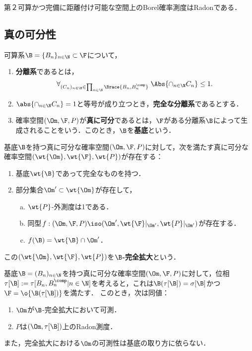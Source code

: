 \documentclass[uplatex,dvipdfmx]{jsreport}
\begin{document}
\begin{proposition}
    第２可算かつ完備に距離付け可能な空間上のBorel確率測度はRadonである．
\end{proposition}

\subsection{真の可分性}

\begin{definition}
    可算系$\B=\{B_n\}_{n\in\N}\subset\F$について，
    \begin{enumerate}
        \item \textbf{分離系}であるとは，
        \[\forall_{(C_n)_{n\in\N}\in\prod_{n\in\N}\Brace{B_n,B_n^\comp}}\;\Abs{\cap_{n\in\N}C_n}\le1.\]
        \item $\abs{\cap_{n\in\N}C_n}=1$と等号が成り立つとき，\textbf{完全な分離系}であるとする．
        \item 確率空間$(\Om,\F,P)$が\textbf{真に可分}であるとは，$\F$がある分離系$\B$によって生成されることをいう．このとき，$\B$を\textbf{基底}という．
    \end{enumerate}
\end{definition}

\begin{lemma}[真に可分な確率空間には完全拡大が存在する]
    基底$\B$を持つ真に可分な確率空間$(\Om,\F,P)$に対して，次を満たす真に可分な確率空間$(\wt{\Om},\wt{\F},\wt{P})$が存在する：
    \begin{enumerate}
        \item 基底$\wt{\B}$であって完全なものを持つ．
        \item 部分集合$\Om'\subset\wt{\Om}$が存在して，
        \begin{enumerate}[(a)]
            \item $\wt{P}$-外測度は1である．
            \item 同型$f:(\Om,\F,P)\iso(\Om',\wt{\F}|_{\Om'},\wt{P}|_{\Om'})$が存在する．
            \item $f(\B)=\wt{\B}\cap\Om'$．
        \end{enumerate}
    \end{enumerate}
    この$(\wt{\Om},\wt{\F},\wt{P})$を\textbf{$\B$-完全拡大}という．
\end{lemma}

\begin{lemma}
    基底$\B=(B_n)_{n\in\N}$を持つ真に可分な確率空間$(\Om,\F,P)$に対して，位相$\tau[\B]:=\tau[B_n,B_n^\comp|n\in\N]$を考えると，これは$\B(\tau[\B])=\sigma[\B]$かつ$\F=\o{\B(\tau[\B])}$を満たす．
    このとき，次は同値：
    \begin{enumerate}
        \item $\Om$が$\B$-完全拡大において可測．
        \item $P$は$(\Om,\tau[\B])$上のRadon測度．
    \end{enumerate}
    また，完全拡大における$\Om$の可測性は基底の取り方に依らない．
\end{lemma}
\end{document}

